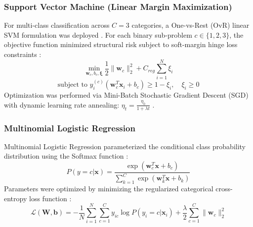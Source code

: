 \documentclass[conference]{IEEEtran}
\begin{document}
\subsubsection{Support Vector Machine (Linear Margin Maximization)}
For multi-class classification across $C=3$ categories, a One-vs-Rest (OvR) linear SVM formulation was deployed \cite{cortes1995}. For each binary sub-problem $c \in \{1, 2, 3\}$, the objective function minimized structural risk subject to soft-margin hinge loss constraints \cite{cortes1995}:
\begin{equation}
\min_{\mathbf{w}_c, b_c, \boldsymbol{\xi}} \frac{1}{2} \|\mathbf{w}_c\|_2^2 + C_{reg} \sum_{i=1}^N \xi_i
\end{equation}
\begin{equation}
\text{subject to } y_i^{(c)} (\mathbf{w}_c^T \mathbf{x}_i + b_c) \ge 1 - \xi_i, \quad \xi_i \ge 0
\end{equation}
Optimization was performed via Mini-Batch Stochastic Gradient Descent (SGD) with dynamic learning rate annealing: $\eta_t = \frac{\eta_0}{1 + \lambda t}$ \cite{hastie2009}.

\subsubsection{Multinomial Logistic Regression}
Multinomial Logistic Regression parameterized the conditional class probability distribution using the Softmax function \cite{hastie2009}:
\begin{equation}
P(y = c | \mathbf{x}) = \frac{\exp(\mathbf{w}_c^T \mathbf{x} + b_c)}{\sum_{k=1}^C \exp(\mathbf{w}_k^T \mathbf{x} + b_k)}
\end{equation}
Parameters were optimized by minimizing the regularized categorical cross-entropy loss function \cite{hastie2009}:
\begin{equation}
\mathcal{L}(\mathbf{W}, \mathbf{b}) = -\frac{1}{N} \sum_{i=1}^N \sum_{c=1}^C y_{ic} \log P(y_i = c | \mathbf{x}_i) + \frac{\lambda}{2} \sum_{c=1}^C \|\mathbf{w}_c\|_2^2
\end{equation}
\end{document}
